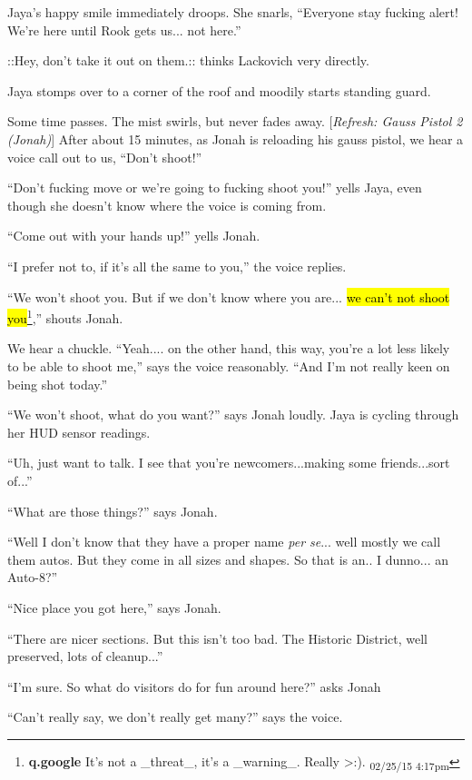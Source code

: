 Jaya's happy smile immediately droops. She snarls, ``Everyone stay fucking alert!  We're here until Rook gets us... not here.''

 {\color[RGB]{74,134,232}::Hey, don't take it out on them.:: } thinks Lackovich very directly.

Jaya stomps over to a corner of the roof and moodily starts standing guard.





Some time passes.  The mist swirls, but never fades away.  {[}\textit{Refresh: Gauss Pistol 2 (Jonah)}{]}  After about 15 minutes, as Jonah is reloading his gauss pistol, we hear a voice call out to us, ``Don't shoot!''

``Don't fucking move or we're going to fucking shoot you!'' yells Jaya, even though she doesn't know where the voice is coming from.

``Come out with your hands up!'' yells Jonah.

``I prefer not to, if it's all the same to you,'' the voice replies.

``We won't shoot you.  But if we don't know where you are... \hl{we can't not shoot you}\footnote{\textbf{q.google }It's not a \_threat\_, it's a \_warning\_.  Really \textgreater :). \textsubscript{02/25/15 4:17pm}},'' shouts Jonah.

We hear a chuckle.  ``Yeah.... on the other hand, this way, you're a lot less likely to be able to shoot me,'' says the voice reasonably.  ``And I'm not really keen on being shot today.''

``We won't shoot, what do you want?'' says Jonah loudly.  Jaya is cycling through her HUD sensor readings.

``Uh, just want to talk.  I see that you're newcomers...making some friends...sort of...''

``What are those things?'' says Jonah.

``Well I don't know that they have a proper name \textit{per se}... well mostly we call them autos.  But they come in all sizes and shapes.  So that is an.. I dunno... an Auto-8?''

``Nice place you got here,'' says Jonah.

``There are nicer sections. But this isn't too bad.  The Historic District, well preserved, lots of cleanup...''

``I'm sure.  So what do visitors do for fun around here?'' asks Jonah

``Can't really say, we don't really get many?'' says the voice.

